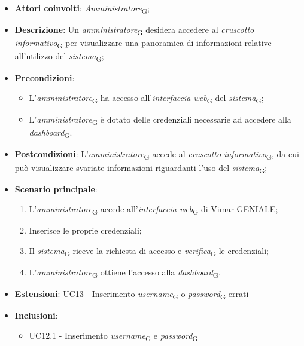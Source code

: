 \begin{itemize}
    \item \textbf{Attori coinvolti}: \textit{Amministratore}\textsubscript{G};
    \item \textbf{Descrizione}: Un \textit{amministratore}\textsubscript{G} desidera accedere al \textit{cruscotto informativo}\textsubscript{G} per visualizzare una panoramica di informazioni relative all’utilizzo del \textit{sistema}\textsubscript{G};
    \item \textbf{Precondizioni}: 
        \begin{itemize}
            \item L’\textit{amministratore}\textsubscript{G} ha accesso all’\textit{interfaccia web}\textsubscript{G} del \textit{sistema}\textsubscript{G};
            \item L’\textit{amministratore}\textsubscript{G} è dotato delle credenziali necessarie ad accedere alla \textit{dashboard}\textsubscript{G}.
        \end{itemize}
    \item \textbf{Postcondizioni}: L’\textit{amministratore}\textsubscript{G} accede al \textit{cruscotto informativo}\textsubscript{G}, da cui può visualizzare svariate informazioni riguardanti l’uso del \textit{sistema}\textsubscript{G};
    \item \textbf{Scenario principale}:
    \begin{enumerate}
    \item L’\textit{amministratore}\textsubscript{G} accede all’\textit{interfaccia web}\textsubscript{G} di Vimar GENIALE;
    \item Inserisce le proprie credenziali;
    \item Il \textit{sistema}\textsubscript{G} riceve la richiesta di accesso e \textit{verifica}\textsubscript{G} le credenziali;
    \item L’\textit{amministratore}\textsubscript{G} ottiene l’accesso alla \textit{dashboard}\textsubscript{G}.
    \end{enumerate}
    \item \textbf{Estensioni}: UC13 - Inserimento \textit{username}\textsubscript{G} o \textit{password}\textsubscript{G} errati
    \item \textbf{Inclusioni}: 
        \begin{itemize}
            \item UC12.1 - Inserimento \textit{username}\textsubscript{G} e \textit{password}\textsubscript{G}
        \end{itemize}
\end{itemize}


